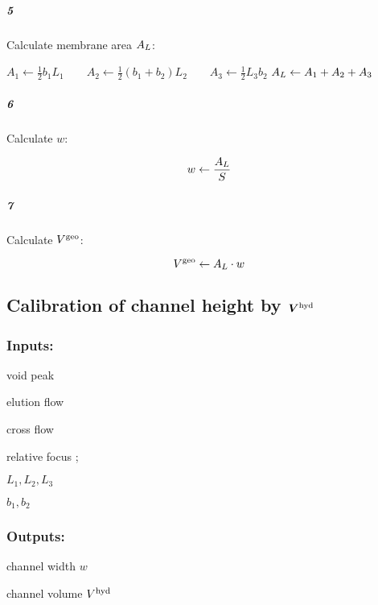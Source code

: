 \subparagraph{5} Calculate membrane area $A_L$:
\begin{algorithmic}
  \State $       A_1 \leftarrow \frac{1}{2} b_1  L_1  
  \qquad A_2 \leftarrow  \frac{1}{2} (b_1 + b_2) L_2  
  \qquad A_3 \leftarrow \frac{1}{2} L_3b_2  
  $\vspace*{.5ex}
  \State $  A_L \leftarrow A_1 + A_2 + A_3
  $\vspace*{.5ex}
\end{algorithmic}

\subparagraph{6} Calculate $w$:\vspace*{-6.5ex}
\begin{algorithmic}
  \State  \[ w \leftarrow \frac{\displaystyle A_L}{\displaystyle S} \]
\end{algorithmic}

\subparagraph{7} Calculate $V^\text{geo}$:\vspace*{-6.5ex}
\begin{algorithmic}
  \State  \[ V^\text{geo} \leftarrow A_L \cdot w \]
\end{algorithmic}
\clearpage
\subsection*{Calibration of channel height by $\bm{V^\text{hyd}}$}
\subsubsection*{Inputs:}
\label{sec:CalibVhyd}
\begin{multicols}{3}
  \begin{packed_item}
    \item void peak \tvoid
    \item elution flow \Ve
    \item cross flow \Vc
    \item relative focus \zP;
    \item $L_1, L_2, L_3$
    \item $b_1, b_2$
  \end{packed_item}
\end{multicols}

\subsubsection*{Outputs:}
\begin{multicols}{3}
  \begin{packed_item}
    \item channel width $w$
    \item channel volume $V^\text{hyd}$
  \end{packed_item}
\end{multicols}

